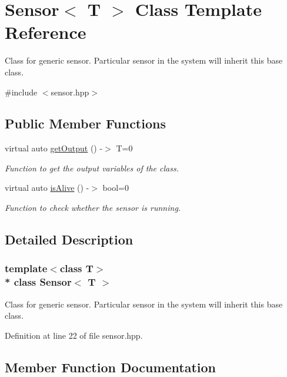 \hypertarget{class_sensor}{}\section{Sensor$<$ T $>$ Class Template Reference}
\label{class_sensor}


Class for generic sensor. Particular sensor in the system will inherit this base class.  




{\ttfamily \#include $<$sensor.\+hpp$>$}

\subsection*{Public Member Functions}
\begin{DoxyCompactItemize}
\item 
virtual auto \hyperlink{class_sensor_abdc2eb130cb935cb090470d1fe6cc499}{get\+Output} () -\/$>$ T=0
\begin{DoxyCompactList}\small\item\em Function to get the output variables of the class. \end{DoxyCompactList}\item 
virtual auto \hyperlink{class_sensor_a7ae0a8c02805d3b2b8306d01da2a2db8}{is\+Alive} () -\/$>$ bool=0
\begin{DoxyCompactList}\small\item\em Function to check whether the sensor is running. \end{DoxyCompactList}\end{DoxyCompactItemize}


\subsection{Detailed Description}
\subsubsection*{template$<$class T$>$\\*
class Sensor$<$ T $>$}

Class for generic sensor. Particular sensor in the system will inherit this base class. 

Definition at line 22 of file sensor.\+hpp.



\subsection{Member Function Documentation}
